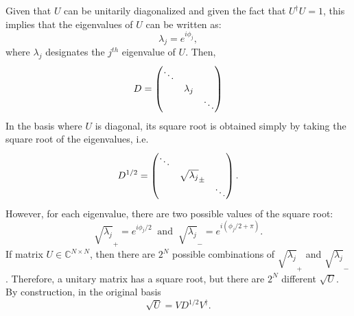 \documentclass[12pt]{article}
\begin{document}
\begin{appendices}

Given that $U$ can be unitarily diagonalized and given the fact that $U^{\dagger}U = 1$, this implies that the eigenvalues of $U$ can be written as:
\begin{equation}
    \lambda_j = e^{i\phi _j},
    \label{eq:EigenvaluesU}
\end{equation}
where $\lambda_j$ designates the $j^{th}$ eigenvalue of $U$. Then,
\[D = \pmqty{\dmat{\ddots,\lambda_j,\ddots}}\]
In the basis where $U$ is diagonal, its square root is obtained simply by taking the square root of the eigenvalues, i.e.
\[D^{1/2} = \pmqty{\dmat{\ddots,\sqrt{\lambda_j}_\pm,\ddots}}.\]
However, for each eigenvalue, there are two possible values of the square root:
\begin{equation}
    \sqrt{\lambda_j}_+ = e^{i\phi _j/2} \; \; \textrm{and} \; \; \sqrt{\lambda_j}_- = e^{i(\phi _j/2+\pi)}.
    \label{eq:RootEigenvalues}
\end{equation}
If matrix $U \in \mathbb{C}^{N\times N}$, then there are $2^N$ possible combinations of  $\sqrt{\lambda_j}_+$ and $\sqrt{\lambda_j}_-$. Therefore, a unitary matrix has a square root, but there are $2^N$ different $\sqrt{U}$. By construction, in the original basis
\[\sqrt{U} = VD^{1/2}V^\dag.\]



\end{appendices}
\end{document}
